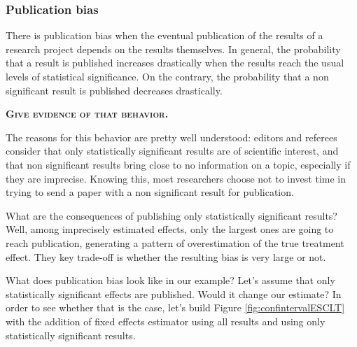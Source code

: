 \documentclass[]{book}
\theoremstyle{definition}
\theoremstyle{definition}
\theoremstyle{definition}
\theoremstyle{remark}
\let\BeginKnitrBlock\begin \let\EndKnitrBlock\end
\begin{document}
\hypertarget{publication-bias-1}{%
\subsubsection{Publication bias}\label{publication-bias-1}}

There is publication bias when the eventual publication of the results of a research project depends on the results themselves.
In general, the probability that a result is published increases drastically when the results reach the usual levels of statistical significance.
On the contrary, the probability that a non significant result is published decreases drastically.

\textbf{\textsc{Give evidence of that behavior.}}

The reasons for this behavior are pretty well understood: editors and referees consider that only statistically significant results are of scientific interest, and that non significant results bring close to no information on a topic, especially if they are imprecise.
Knowing this, most researchers choose not to invest time in trying to send a paper with a non significant result for publication.

What are the consequences of publishing only statistically significant results?
Well, among imprecisely estimated effects, only the largest ones are going to reach publication, generating a pattern of overestimation of the true treatment effect.
They key trade-off is whether the resulting bias is very large or not.

\BeginKnitrBlock{example}
\protect\hypertarget{exm:unnamed-chunk-163}{}{\label{exm:unnamed-chunk-163} }What does publication bias look like in our example?
Let's assume that only statistically significant effects are published.
Would it change our estimate?
In order to see whether that is the case, let's build Figure \ref{fig:confintervalESCLT} with the addition of fixed effects estimator using all results and using only statistically significant results.
\EndKnitrBlock{example}
\end{document}
